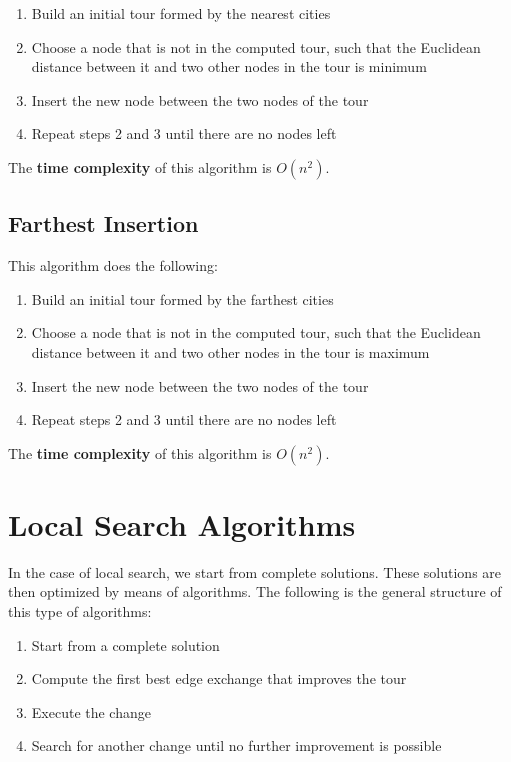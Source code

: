 \documentclass{article}
\begin{document}
\begin{enumerate}
	\item Build an initial tour formed by the nearest cities
	\item Choose a node that is not in the computed tour, such that the Euclidean distance between it and two other nodes in the tour is minimum
	\item Insert the new node between the two nodes of the tour
	\item Repeat steps 2 and 3 until there are no nodes left
\end{enumerate}
The \textbf{time complexity} of this algorithm is $O(n^2)$.

\subsection{Farthest Insertion}
This algorithm does the following:

\begin{enumerate}
	\item Build an initial tour formed by the farthest cities
	\item Choose a node that is not in the computed tour, such that the Euclidean distance between it and two other nodes in the tour is maximum
	\item Insert the new node between the two nodes of the tour
	\item Repeat steps 2 and 3 until there are no nodes left
\end{enumerate}
The \textbf{time complexity} of this algorithm is $O(n^2)$.

\section{Local Search Algorithms}
In the case of local search, we start from complete solutions. These solutions are then optimized by means of algorithms. The following is the general structure of this type of algorithms:

\begin{enumerate}
	\item Start from a complete solution
	\item Compute the first best edge exchange that improves the tour
	\item Execute the change
	\item Search for another change until no further improvement is possible
\end{enumerate}
\end{document}
